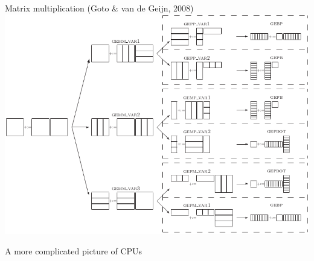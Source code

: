 \documentclass[sans,mathserif]{beamer}
\begin{document}
\begin{frame}{Matrix multiplication (Goto \& van de Geijn, 2008)}
\includegraphics[width=\textwidth]{goto_matmul.png}  
\end{frame}

\begin{frame}
  \begin{center}
    \LARGE A more complicated picture of CPUs
  \end{center}
\end{frame}
\end{document}
